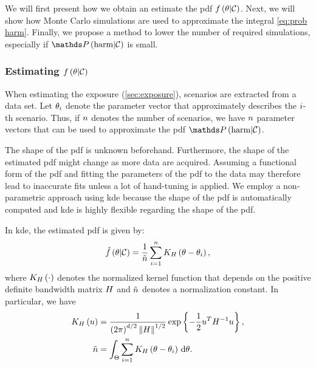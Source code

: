 We will first present how we obtain an estimate the \ac{pdf} $f\left(  \theta | \mathcal{C}  \right)$. Next, we will show how Monte Carlo simulations are used to approximate the integral \cref{eq:prob harm}. Finally, we propose a method to lower the number of required simulations, especially if $\probabilitycond{\harm}{\scenariocategory}$ is small.



\subsubsection{Estimating $f\left(  \theta | \mathcal{C}  \right)$}
\label{sec:estimating parameter distribution}

When estimating the exposure (\cref{sec:exposure}), scenarios are extracted from a data set. Let $\theta_{i}$ denote the parameter vector that approximately describes the $i$-th scenario. Thus, if $n$ denotes the number of scenarios, we have $n$ parameter vectors that can be used to approximate the \ac{pdf} $\probabilitycond{\harm}{\scenariocategory}$.

The shape of the \ac{pdf} is unknown beforehand. Furthermore, the shape of the estimated \ac{pdf} might change as more data are acquired. Assuming a functional form of the \ac{pdf} and fitting the parameters of the \ac{pdf} to the data may therefore lead to inaccurate fits unless a lot of hand-tuning is applied. We employ a non-parametric approach using \ac{kde} \autocite{rosenblatt1956remarks, parzen1962estimation} because the shape of the \ac{pdf} is automatically computed and \ac{kde} is highly flexible regarding the shape of the \ac{pdf}.

In \ac{kde}, the estimated \ac{pdf} is given by:
\begin{equation}
	\label{eq:kde}
	\hat{f}\left(  \theta | \mathcal{C}  \right) = 
	\frac{1}{\tilde{n}} \sum_{i=1}^{n} K_{H} \left( \theta - \theta_{i} \right),
\end{equation}
where $K_{H} \left( \cdot \right)$ denotes the normalized kernel function that depends on the positive definite bandwidth matrix $H$ and $\tilde{n}$ denotes a normalization constant. In particular, we have
\begin{align}
	K_{H} \left( u \right) &= 
	\frac{1}{\left(2\pi\right)^{d/2} \left\| H \right\|^{1/2}}
	\exp \left\{ -\frac{1}{2} u^T H^{-1} u \right\}, \\
	\tilde{n} &= \int_{\Theta} \sum_{i=1}^{n}
	K_{H} \left( \theta - \theta_{i} \right) \,\mathrm{d}\theta.
\end{align}



